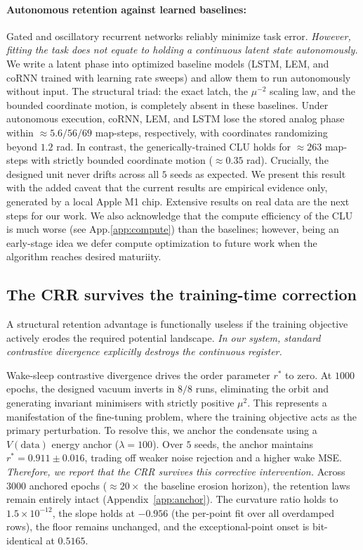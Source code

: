 \documentclass{article}
\begin{document}
\paragraph{Autonomous retention against learned baselines:} Gated and oscillatory recurrent networks reliably minimize task error. \emph{However, fitting the task does not equate to holding a continuous latent state autonomously.} We write a latent phase into optimized baseline models (LSTM, LEM, and coRNN trained with learning rate sweeps) and allow them to run autonomously without input. The structural triad: the exact latch, the $\mu^{-2}$ scaling law, and the bounded coordinate motion, is completely absent in these baselines. Under autonomous execution, coRNN, LEM, and LSTM lose the stored analog phase within $\approx5.6/56/69$ map-steps, respectively, with coordinates randomizing beyond $1.2$ rad. In contrast, the generically-trained CLU holds for $\approx263$ map-steps with strictly bounded coordinate motion ($\approx0.35$ rad). Crucially, the designed unit never drifts across all $5$ seeds as expected. We present this result with the added caveat that the current results are empirical evidence only, generated by a local Apple M1 chip. Extensive results on real data are the next steps for our work. We also acknowledge that the compute efficiency of the CLU is much worse (see App.\ref{app:compute}) than the baselines; however, being an early-stage idea we defer compute optimization to future work when the algorithm reaches desired maturiity.

\subsection{The CRR survives the training-time correction}\label{sec:cure}

A structural retention advantage is functionally useless if the training objective actively erodes the required potential landscape. \emph{In our system, standard contrastive divergence explicitly destroys the continuous register.}

Wake-sleep contrastive divergence drives the order parameter $r^*$ to zero. At $1000$ epochs, the designed vacuum inverts in $8/8$ runs, eliminating the orbit and generating invariant minimisers with strictly positive $\mu^2$. This represents a manifestation of the fine-tuning problem, where the training objective acts as the primary perturbation. To resolve this, we anchor the condensate using a $V(\text{data})$ energy anchor ($\lambda=100$). Over $5$ seeds, the anchor maintains $r^*=0.911\pm0.016$, trading off weaker noise rejection and a higher wake MSE. \emph{Therefore, we report that the CRR survives this corrective intervention.} Across $3000$ anchored epochs ($\approx20\times$ the baseline erosion horizon), the retention laws remain entirely intact (Appendix~\ref{app:anchor}). The curvature ratio holds to $1.5\!\times\!10^{-12}$, the slope holds at $-0.956$ (the per-point fit over all overdamped rows), the floor remains unchanged, and the exceptional-point onset is bit-identical at $0.5165$.
\end{document}
